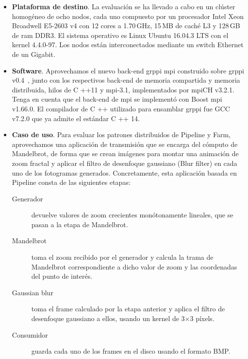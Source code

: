 \begin{itemize}

\item \textbf{Plataforma de destino}. La evaluación se ha llevado a cabo en un clúster homogéneo de ocho nodos, cada uno compuesto por un procesador Intel Xeon Broadwell E5-2603 v4 con 12 cores a 1.70\,GHz, 15\,MB de caché L3 y 128\,GB de \acrshort{ram} DDR3. El sistema operativo es Linux Ubuntu 16.04.3 LTS con el kernel 4.4.0-97. Los nodos están interconectados mediante un switch Ethernet de un Gigabit.

\item \textbf{Software}. Aprovechamos el nuevo back-end \acrshort{grppi} \acrshort{mpi} construido sobre \acrshort{grppi} v0.4~\cite{grppi-github}, junto con los respectivos back-end de memoria compartida y memoria distribuida, hilos de C ++11 y \acrshort{mpi}-3.1, implementados por \acrshort{mpi}CH v3.2.1. Tenga en cuenta que el back-end de \acrshort{mpi} se implementó con Boost \acrshort{mpi} v1.66.0. El compilador de C ++ utilizado para ensamblar \acrshort{grppi} fue GCC v7.2.0 que ya admite el estándar C ++ 14.

\item \textbf{Caso de uso}. Para evaluar los patrones distribuidos de Pipeline y Farm, aprovechamos una aplicación de transmisión que se encarga del cómputo de Mandelbrot, de forma que se crean imágenes para montar una animación de zoom fractal y aplicar el filtro de desenfoque gaussiano (Blur filter) en cada uno de los fotogramas generados. Concretamente, esta aplicación basada en Pipeline consta de las siguientes etapas:

\begin{description}
\item[Generador] devuelve valores de zoom crecientes monótonamente lineales, que se pasan a la etapa de Mandelbrot.
\item[Mandelbrot] toma el zoom recibido por el generador y calcula la trama de Mandelbrot correspondiente a dicho valor de zoom y las coordenadas del punto de interés.
\item[Gaussian blur] toma el frame calculado por la etapa anterior y aplica el filtro de desenfoque gaussiano a ellos, usando un kernel de 3$\times$3 píxels.
\item[Consumidor] guarda cada uno de los frames en el disco usando el formato BMP.
\end{description}

\end{itemize}

